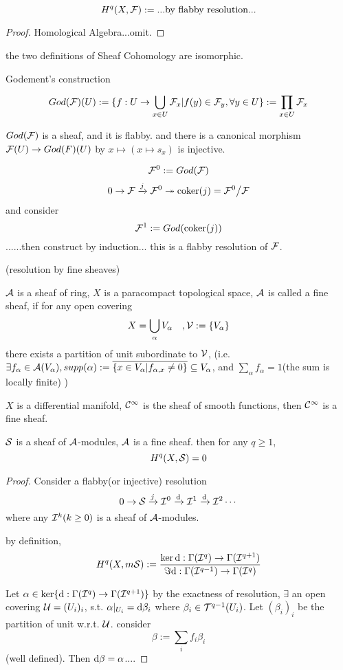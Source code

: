 \begin{definition}
$$H^q(X,\mathcal{F}):=...\text{by flabby resolution...}$$
\end{definition}

\begin{proof}
Homological Algebra...omit.
\end{proof}

the two definitions of Sheaf Cohomology are isomorphic.


Godement's construction

$$God(\mathcal{F})(U):=
\{f:U\to\bigcup_{x\in U}\mathcal{F}_x|
f(y)\in\mathcal{F}_y,\forall y\in U\}
:=\prod_{x\in U}\mathcal{F}_x$$

$God(\mathcal{F})$ is a sheaf, and it is flabby. and there is a canonical
morphism $\mathcal{F}(U)\to God(F)(U)$ by $x\mapsto(x\mapsto s_x)$ is injective.

$$\mathcal{F}^0:=God(\mathcal{F})$$
$$0\to\mathcal{F}\xrightarrow{j}\mathcal{F}^0\twoheadrightarrow\operatorname{coker}(j)=\mathcal{F}^0\big/\mathcal{F}$$
and consider
$$\mathcal{F}^1:=God(\operatorname{coker}(j))$$
......then construct by induction... this is a flabby resolution of $\mathcal{F}$.

\begin{definition}(resolution by fine sheaves)

$\mathcal{A}$ is a sheaf of ring,
$X$ is a paracompact topological space, $\mathcal{A}$
is called a fine sheaf, if for any open covering
$$X=\bigcup_{\alpha}V_{\alpha}\quad,\mathcal{V}:=\{V_{\alpha}\}$$
there exists a partition of unit subordinate to $\mathcal{V}$,
(i.e. $\exists f_{\alpha}\in\mathcal{A}(V_{\alpha}),supp(\alpha)
:=\overline{\{x\in V_{\alpha}|f_{\alpha,x}\neq 0\}}\subseteq V_{\alpha}$, and
$\sum_{\alpha}f_{\alpha}=1$(the sum is locally finite)
 )
\end{definition}

\begin{example}
$X$ is a differential manifold,
$\mathcal{C}^{\infty}$ is the sheaf of smooth functions,
then $\mathcal{C}^{\infty}$ is a fine sheaf.
\end{example}

\begin{thm}
$\mathcal{S}$ is a sheaf of $\mathcal{A}$-modules,
$\mathcal{A}$ is a fine sheaf. then for any $q\geq 1$,
$$H^q(X,\mathcal{S})=0$$
\end{thm}
\begin{proof}
Consider a flabby(or injective) resolution
$$0\to\mathcal{S}\xrightarrow{j}\mathcal{I}^0\xrightarrow{\mathrm{d}}\mathcal{I}^1\xrightarrow{\mathrm{d}}\mathcal{I}^2\cdots$$
where any $\mathcal{I}^k(k\geq 0)$ is a sheaf of $\mathcal{A}$-modules.

by definition,
$$H^q(X,m\mathcal{S}):=\frac{\ker\mathrm{d}:\Gamma(\mathcal{I}^q)\to\Gamma(\mathcal{I}^{q+1})}
                       {\Im\mathrm{d}:\Gamma(\mathcal{I}^{q-1})\to\Gamma(\mathcal{I}^{q})}$$

Let $\alpha\in\ker\{\mathrm{d}:\Gamma(\mathcal{I}^q)\to\Gamma(\mathcal{I}^{q+1})\}$
by the exactness of resolution, $\exists$ an open covering $\mathcal{U}=(U_{i})_{i}$,
s.t. $\alpha|_{U_{i}}=\mathrm{d}\beta_{i}$
where $\beta_{i}\in\mathcal{T}^{q-1}(U_{i})$.
Let $(\beta_{i})_{i}$ be the partition of unit w.r.t. $\mathcal{U}$.
consider
$$\beta:=\sum_{i}f_i\beta_i$$
(well defined). Then $\mathrm{d}\beta=\alpha$....
\end{proof}

